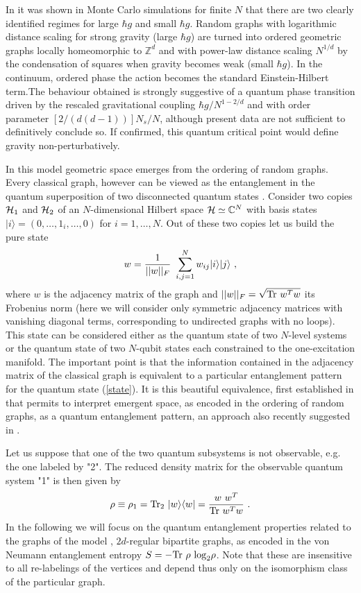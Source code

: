 \documentclass[twocolumn,
preprintnumbers,amsmath,amssymb]{revtex4}
\begin{document}
In \cite{tru2} it was shown in Monte Carlo simulations for finite $N$ that there are two clearly identified regimes for large $\hbar g$ and small $\hbar g$. Random graphs with logarithmic distance scaling for strong gravity (large $\hbar g$) are turned into ordered geometric graphs locally homeomorphic to $\mathbb{Z}^d$ and with power-law distance scaling $N^{1/d}$ by the condensation of squares when gravity becomes weak (small $\hbar g$). In the continuum, ordered phase the action becomes the standard Einstein-Hilbert term.The behaviour obtained is strongly suggestive of a quantum phase transition driven by the rescaled gravitational coupling $\hbar g/N^{1-2/d}$ and with order parameter $\left[2/(d(d-1))\right] N_s/N$, although present data are not sufficient to definitively conclude so. If confirmed, this quantum critical point would define gravity non-perturbatively. 

In this model geometric space emerges from the ordering of random graphs. Every classical graph, however can be viewed as the entanglement in the quantum superposition of two disconnected quantum states \cite{zan}. Consider two copies ${\cal H}_1$ and ${\cal H}_2$ of an $N$-dimensional Hilbert space ${\cal H} \simeq \mathbb{C}^N$ with basis states $ |i\rangle = (0, \dots, 1_i,\dots,0)$ for $i=1, \dots, N$. Out of these two copies let us build the pure state 
\begin{equation}
w= {1\over ||w||_F} \ \sum_{i,j=1}^N w_{ij} |i\rangle |j\rangle \ ,
\label{state}
\end{equation}
where $w$ is the adjacency matrix of the graph and  $||w||_F = \sqrt{{\rm Tr} \ w^T w}$ its Frobenius norm (here we will consider only symmetric adjacency matrices with vanishing diagonal terms, corresponding to undirected graphs with no loops). This state can be considered either as the quantum state of two $N$-level systems or the quantum state of two $N$-qubit states each constrained to the one-excitation manifold.  The important point is that the information contained in the adjacency matrix of the classical graph is equivalent to a particular entanglement pattern for the quantum state (\ref{state}). It is this beautiful equivalence, first established in \cite{zan} that permits to interpret emergent space, as encoded in the ordering of random graphs, as a quantum entanglement pattern, an approach also recently suggested in \cite{carrol}.  

Let us suppose that one of the two quantum subsystems is not observable, e.g. the one labeled by "2". The reduced density matrix for the observable quantum system "1" is then given by 
\begin{equation}
\rho \equiv \rho_1 = {\rm Tr}_2 \ |w\rangle \langle w| = {w \ w^T\over {\rm Tr} \ w^T w} \ .
\label{reddens}
\end{equation}
In the following we will focus on the quantum entanglement properties related to the graphs of the model \cite{tru2}, $2d$-regular bipartite graphs, as encoded in the von Neumann entanglement entropy $S=- {\rm Tr}\  \rho \ {\rm log}_2 \rho $. Note that these are insensitive to all re-labelings of the vertices and depend thus only on the isomorphism class of the particular graph. 
\end{document}
